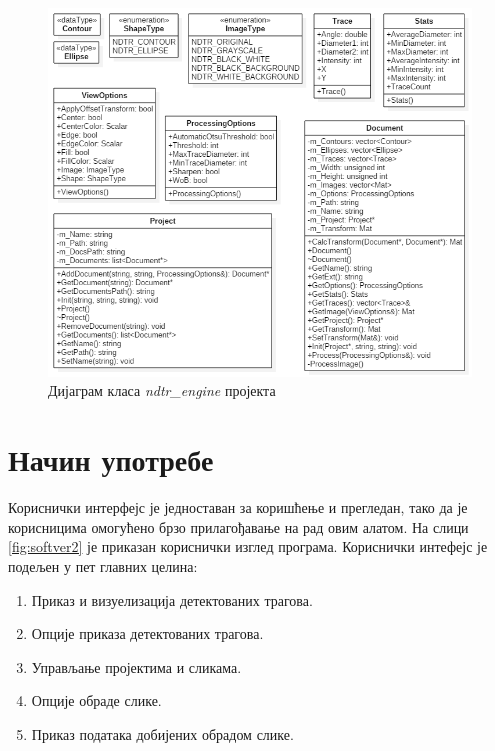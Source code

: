 \documentclass[12pt,a4paper,serbian,oneside]{book}
\begin{document}
\begin{figure}[H]
\begin{center}
\includegraphics[width=150mm]{images/engine.png}
\end{center}
\caption{Дијаграм класа \textit{ndtr\_engine} пројекта}
\label{fig:engine}
\end{figure}

\section{Начин употребе}

Кориснички интерфејс је једноставан за коришћење и прегледан, тако да је корисницима омогућено брзо прилагођавање на рад овим алатом.
На слици \ref{fig:softver2}  је приказан кориснички изглед програма. Кориснички интефејс је подељен у пет главних целина:

\begin{enumerate}
  \item Приказ и визуелизација детектованих трагова.
  \item Опције приказа детектованих трагова.
  \item Управљање пројектима и сликама.
  \item Опције обраде слике.
  \item Приказ података добијених обрадом слике.
\end{enumerate}
\end{document}
